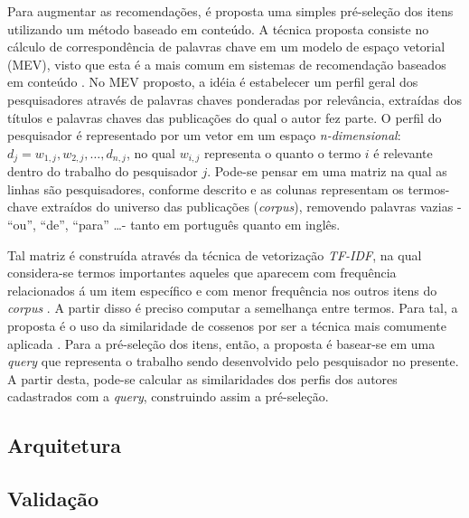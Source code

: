 \documentclass[12pt]{article}
\begin{document}
Para augmentar as recomendações, é proposta uma simples pré-seleção dos itens utilizando um método baseado em conteúdo. A 
técnica proposta consiste no cálculo de correspondência de palavras chave em um modelo de espaço vetorial (MEV), visto que 
esta é a mais comum em sistemas de recomendação baseados em conteúdo \cite{ricci2011introduction}. No MEV proposto, a idéia é estabelecer um 
perfil geral dos pesquisadores através de palavras chaves ponderadas por relevância, extraídas dos títulos e palavras chaves 
das publicações do qual o autor fez parte. O perfil do pesquisador é representado por um vetor em um espaço \textit{n-dimensional}: 
$d_j = {w_{1,j}, w_{2,j}, \dots ,d_{n,j}}$, no qual $w_{i,j}$ representa o quanto o termo $i$ é relevante dentro do trabalho do 
pesquisador $j$. Pode-se pensar em uma matriz na qual as linhas são pesquisadores, conforme descrito e as colunas representam os 
termos-chave extraídos do universo das publicações (\textit{corpus}), removendo palavras vazias - “ou”, “de”, “para” \dots - 
tanto em português quanto em inglês.

Tal matriz é construída através da técnica de vetorização \textit{TF-IDF}, na qual considera-se termos importantes aqueles que 
aparecem com frequência relacionados á um item específico e com menor frequência nos outros itens do \textit{corpus} 
\cite{pazzani2007content}. A partir disso é preciso computar a semelhança entre termos. Para tal, a proposta é o uso da 
similaridade de cossenos por ser a técnica mais comumente aplicada \cite{ricci2011introduction}. Para a pré-seleção dos itens, então, a 
proposta é basear-se em uma \textit{query} que representa o trabalho sendo desenvolvido pelo pesquisador no presente. A partir 
desta, pode-se calcular as similaridades dos perfis dos autores cadastrados com a \textit{query}, construindo assim a pré-seleção.

\subsection{Arquitetura} \label{sect:arch}


\subsection{Validação} \label{sect:validation}

\end{document}
